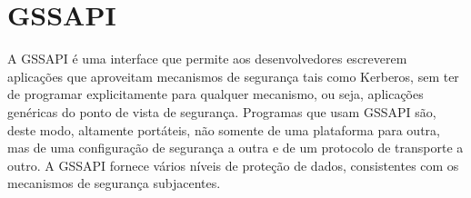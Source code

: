  




\section{GSSAPI}

A GSSAPI é uma interface que permite aos desenvolvedores escreverem aplicações que aproveitam mecanismos de segurança tais como Kerberos, sem ter de programar explicitamente para qualquer mecanismo, ou seja, aplicações genéricas do ponto de vista de segurança. Programas que usam GSSAPI são, deste modo, altamente portáteis, não somente de uma plataforma para outra, mas de uma configuração de segurança a outra e de um protocolo de transporte a outro. A GSSAPI fornece vários níveis de proteção de dados, consistentes com os mecanismos de segurança subjacentes.\cite{HUGO}